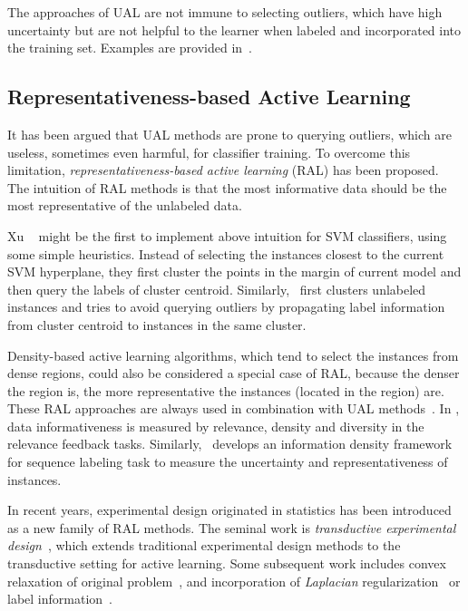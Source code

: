 The approaches of \mbox{UAL} are not immune to selecting outliers, which have high uncertainty but are not helpful to the learner when labeled and incorporated into the training set. Examples are provided in~\cite{McCallum1998icml}.

\subsection{Representativeness-based Active Learning}
It has been argued that \mbox{UAL} methods are prone to querying outliers, which are useless, sometimes even harmful, for classifier training. To overcome this limitation, \textit{representativeness-based active learning} (\mbox{RAL}) has been proposed. The intuition of \mbox{RAL} methods is that the most informative data should be the most representative of the unlabeled data.

Xu \etal~\cite{Xu2003ecir} might be the first to implement above intuition for \mbox{SVM} classifiers, using some simple heuristics. Instead of selecting the instances closest to the current \mbox{SVM} hyperplane, they first cluster the points in the margin of current model and then query the labels of cluster centroid. Similarly,~\cite{Nguyen2004icml} first clusters unlabeled instances and tries to avoid querying outliers by propagating label information from cluster centroid to instances in the same cluster. 

Density-based active learning algorithms, which tend to select the instances from dense regions, could also be considered a special case of \mbox{RAL}, because the denser the region is, the more representative the instances (located in the region) are. These \mbox{RAL} approaches are always used in combination with \mbox{UAL} methods~\cite{Xu2007ecir,Settles2008emnlp}. In \cite{Xu2007ecir}, data informativeness is measured by relevance, density and diversity in the relevance feedback tasks. Similarly,~\cite{Settles2008emnlp} develops an information density framework for sequence labeling task to measure the uncertainty and representativeness of instances.

In recent years, experimental design originated in statistics has been introduced as a new family of \mbox{RAL} methods. The seminal work is \textit{transductive experimental design}~\cite{Yu2006icml}, which extends traditional experimental design methods to the transductive setting for active learning. Some subsequent work includes convex relaxation of original problem~\cite{yu2008sigir}, and incorporation of \textit{Laplacian} regularization~\cite{he2007sigir} or  label information~\cite{zhen2010sigir}.


